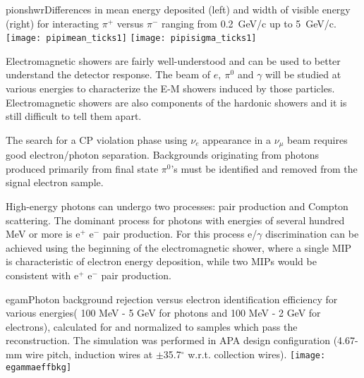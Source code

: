 \begin{description}
\begin{cdrfigure}{pionshwr}{Differences in mean energy deposited (left) and width of visible energy (right) 
for interacting $\pi^+$ versus $\pi^-$ ranging from 0.2~GeV/c up to 5~GeV/c. }
\texttt{[image: pipimean\_ticks1]}
\texttt{[image: pipisigma\_ticks1]}
\end{cdrfigure}


\item [Characterization of electromagnetic showers]


Electromagnetic showers are fairly well-understood and can be used to better understand the detector response. The beam of $e,\  \pi^0$ and $\gamma$ will be studied at various energies to characterize the E-M showers induced by those particles. Electromagnetic showers are also components of the hardonic showers and it is still difficult to tell them apart. 

\item [Study of $e/\gamma$ separation capabilities]

The search for a CP violation phase using $\nu_e$ appearance 
in a $\nu_\mu$ beam requires good electron/photon separation.
Backgrounds originating from photons produced primarily from 
final state $\pi^0$'s must be identified and removed from the signal
electron sample. 

High-energy photons can undergo two processes: pair production and Compton scattering. 
The dominant process for photons with energies of several hundred MeV or more is 
e$^+$ e$^-$ pair production.
For this process e/$\gamma$ discrimination
 can be achieved using the beginning of the electromagnetic shower, where 
a single MIP is characteristic of electron energy deposition, while two MIPs would be consistent 
with e$^+$ e$^-$ pair production. %

\begin{cdrfigure}{egam}{Photon background rejection versus electron identification efficiency for various energies( 100 MeV - 5 GeV for photons and 100 MeV - 2 GeV for electrons), calculated for and normalized to samples which pass the reconstruction.  The simulation was performed in APA design configuration (4.67-mm wire pitch, induction wires at $\pm$35.7$^{\circ}$ w.r.t. collection wires).}
\texttt{[image: egammaeffbkg]}
\end{cdrfigure}



\end{description}
